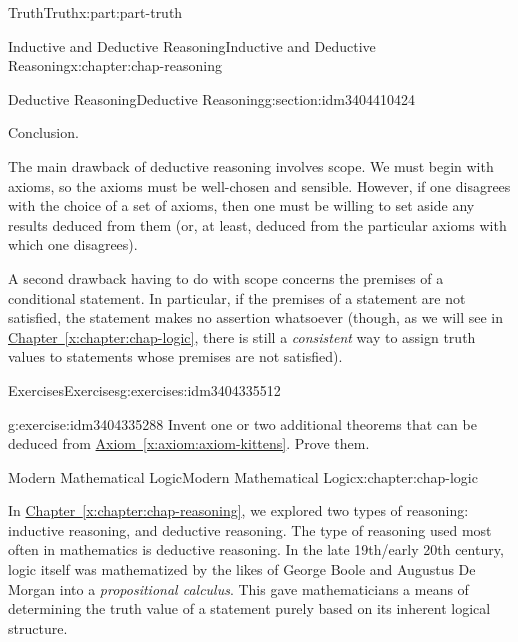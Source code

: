 \documentclass[oneside,10pt,]{book}
\newcommand{\xreffont}{\relax}
\numberwithin{equation}{section}
\begin{document}
\begin{partptx}{Truth}{}{Truth}{}{}{x:part:part-truth}
\begin{chapterptx}{Inductive and Deductive Reasoning}{}{Inductive and Deductive Reasoning}{}{}{x:chapter:chap-reasoning}
\begin{sectionptx}{Deductive Reasoning}{}{Deductive Reasoning}{}{}{g:section:idm3404410424}
\begin{conclusion}{Conclusion.}
\par
The main drawback of deductive reasoning involves scope. We must begin with axioms, so the axioms must be well-chosen and sensible. However, if one disagrees with the choice of a set of axioms, then one must be willing to set aside any results deduced from them (or, at least, deduced from the particular axioms with which one disagrees).%
\par
A second drawback having to do with scope concerns the premises of a conditional statement. In particular, if the premises of a statement are not satisfied, the statement makes no assertion whatsoever (though, as we will see in \hyperref[x:chapter:chap-logic]{Chapter~{\xreffont\ref{x:chapter:chap-logic}}}, there is still a \emph{consistent} way to assign truth values to statements whose premises are not satisfied).%
\end{conclusion}%
%
%
\typeout{************************************************}
\typeout{************************************************}
%
\begin{exercises-subsection-numberless}{Exercises}{}{Exercises}{}{}{g:exercises:idm3404335512}
\begin{divisionexercise}{1}{}{}{g:exercise:idm3404335288}%
Invent one or two additional theorems that can be deduced from \hyperref[x:axiom:axiom-kittens]{Axiom~{\xreffont\ref{x:axiom:axiom-kittens}}}. Prove them.%
\end{divisionexercise}%
\end{exercises-subsection-numberless}
\end{sectionptx}
\end{chapterptx}
%
\typeout{************************************************}
\typeout{************************************************}
%
\begin{chapterptx}{Modern Mathematical Logic}{}{Modern Mathematical Logic}{}{}{x:chapter:chap-logic}
\begin{introduction}{}%
In \hyperref[x:chapter:chap-reasoning]{Chapter~{\xreffont\ref{x:chapter:chap-reasoning}}}, we explored two types of reasoning: inductive reasoning, and deductive reasoning. The type of reasoning used most often in mathematics is deductive reasoning. In the late 19th\slash{}early 20th century, logic itself was mathematized by the likes of George Boole and Augustus De Morgan into a \emph{propositional calculus}. This gave mathematicians a means of determining the truth value of a statement purely based on its inherent logical structure.%

\end{introduction}
\end{chapterptx}
\end{partptx}
\end{document}
